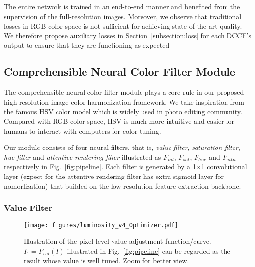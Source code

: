 \documentclass[runningheads]{llncs}
\begin{document}
The entire network is trained in an end-to-end manner and benefited from the supervision of the full-resolution images.
Moreover, we observe that traditional losses in RGB color space is not sufficient for achieving state-of-the-art quality.
We therefore propose auxiliary losses in Section~\ref{subsection:loss} for each DCCF's output to ensure that they are functioning as expected.
    
    
    
    
    \subsection{Comprehensible Neural Color Filter Module}
    \label{subsection:DCCF}
    
    The comprehensible neural color filter module plays a core rule in our proposed high-resolution image color harmonization framework.
We take inspiration from the famous HSV color model which is widely used in photo editing community. 
    Compared with RGB color space, HSV is much more intuitive and easier for humans to interact with computers for color tuning.
    
    Our module consists of four neural filters, that is, \textit{value filter}, \textit{saturation filter}, \textit{hue filter} and \textit{attentive rendering filter} illustrated as $F_{val}$, $F_{sat}$, $F_{hue}$ and $F_{attn}$ respectively in Fig.~\ref{fig:pipeline}.
Each filter is generated by a 1$\times$1 convolutional layer (expect for the attentive rendering filter has extra sigmoid layer for nomorlization) that builded on the low-resolution feature extraction backbone.
    










    
    
\subsubsection{Value Filter} 




    
    \begin{figure}[!thb]
        \centering
        \vspace{-30pt}
        \texttt{[image: figures/luminosity\_v4\_Optimizer.pdf]}\\
        \caption{
            \small Illustration of the pixel-level value adjustment function/curve. $I_1=F_{val}(I)$ illustrated in Fig.~\ref{fig:pipeline} can be regarded as the result whose value is well tuned. Zoom for better view.
            }
        \vspace{-15pt}
        \label{fig:luminosity_curve}
    \end{figure}
    
\end{document}
